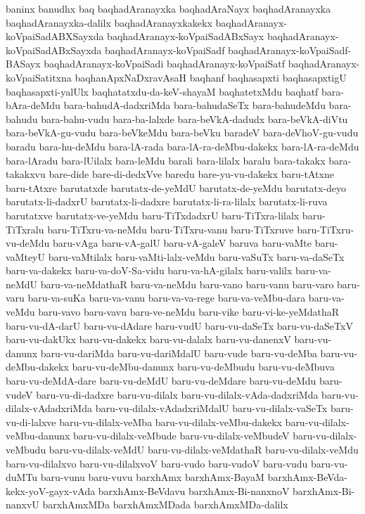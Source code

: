 {baninx
banudhx
baq
baqhadAranayxka
baqhadAraNayx
baqhadAranayxka
baqhadAranayxka-dalilx
baqhadAranayxkakekx
baqhadAranayx-koVpaiSadABXSayxda
baqhadAranayx-koVpaiSadABxSayx
baqhadAranayx-koVpaiSadABxSayxda
baqhadAranayx-koVpaiSadf
baqhadAranayx-koVpaiSadf-BASayx
baqhadAranayx-koVpaiSadi
baqhadAranayx-koVpaiSatf
baqhadAranayx-koVpaiSatitxna
baqhanApxNaDxravAsaH
baqhanf
baqhasapxti
baqhasapxtigU
baqhasapxti-yalUlx
baqhatatxdu-da-keV-shayaM
baqhatetxMdu
baqhatf
bara-bAra-deMdu
bara-bahudA-dadxriMda
bara-bahudaSeTx
bara-bahudeMdu
bara-bahudu
bara-bahu-vudu
bara-ba-lalxde
bara-beVkA-dadudx
bara-beVkA-diVtu
bara-beVkA-gu-vudu
bara-beVkeMdu
bara-beVku
baradeV
bara-deVhoV-gu-vudu
baradu
bara-hu-deMdu
bara-lA-rada
bara-lA-ra-deMbu-dakekx
bara-lA-ra-deMdu
bara-lAradu
bara-lUilalx
bara-leMdu
barali
bara-lilalx
baralu
bara-takakx
bara-takakxvu
bare-dide
bare-di-dedxVve
baredu
bare-yu-vu-dakekx
baru-tAtxne
baru-tAtxre
barutatxde
barutatx-de-yeMdU
barutatx-de-yeMdu
barutatx-deyo
barutatx-li-dadxrU
barutatx-li-dadxre
barutatx-li-ra-lilalx
barutatx-li-ruva
barutatxve
barutatx-ve-yeMdu
baru-TiTxdadxrU
baru-TiTxra-lilalx
baru-TiTxralu
baru-TiTxru-va-neMdu
baru-TiTxru-vanu
baru-TiTxruve
baru-TiTxru-vu-deMdu
baru-vAga
baru-vA-galU
baru-vA-galeV
baruva
baru-vaMte
baru-vaMteyU
baru-vaMtilalx
baru-vaMti-lalx-veMdu
baru-vaSuTx
baru-va-daSeTx
baru-va-dakekx
baru-va-doV-Sa-vidu
baru-va-hA-gilalx
baru-valilx
baru-va-neMdU
baru-va-neMdathaR
baru-va-neMdu
baru-vano
baru-vanu
baru-varo
baru-varu
baru-va-suKa
baru-va-vanu
baru-va-va-rege
baru-va-veMbu-dara
baru-va-veMdu
baru-vavo
baru-vavu
baru-ve-neMdu
baru-vike
baru-vi-ke-yeMdathaR
baru-vu-dA-darU
baru-vu-dAdare
baru-vudU
baru-vu-daSeTx
baru-vu-daSeTxV
baru-vu-dakUkx
baru-vu-dakekx
baru-vu-dalalx
baru-vu-danenxV
baru-vu-danunx
baru-vu-dariMda
baru-vu-dariMdalU
baru-vude
baru-vu-deMba
baru-vu-deMbu-dakekx
baru-vu-deMbu-danunx
baru-vu-deMbudu
baru-vu-deMbuva
baru-vu-deMdA-dare
baru-vu-deMdU
baru-vu-deMdare
baru-vu-deMdu
baru-vudeV
baru-vu-di-dadxre
baru-vu-dilalx
baru-vu-dilalx-vAda-dadxriMda
baru-vu-dilalx-vAdadxriMda
baru-vu-dilalx-vAdadxriMdalU
baru-vu-dilalx-vaSeTx
baru-vu-di-lalxve
baru-vu-dilalx-veMba
baru-vu-dilalx-veMbu-dakekx
baru-vu-dilalx-veMbu-danunx
baru-vu-dilalx-veMbude
baru-vu-dilalx-veMbudeV
baru-vu-dilalx-veMbudu
baru-vu-dilalx-veMdU
baru-vu-dilalx-veMdathaR
baru-vu-dilalx-veMdu
baru-vu-dilalxvo
baru-vu-dilalxvoV
baru-vudo
baru-vudoV
baru-vudu
baru-vu-duMTu
baru-vunu
baru-vuvu
barxhAmx
barxhAmx-BayaM
barxhAmx-BeVda-kekx-yoV-gayx-vAda
barxhAmx-BeVdavu
barxhAmx-Bi-nanxnoV
barxhAmx-Bi-nanxvU
barxhAmxMDa
barxhAmxMDada
barxhAmxMDa-dalilx
}
